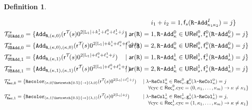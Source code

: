\documentclass[10pt,a4paper]{amsart}
\theoremstyle{definition}
\numberwithin{equation}{section}
\theoremstyle{plain}
\theoremstyle{definition}
\newtheorem{definition}[definition]{Definition}
\theoremstyle{myexample}
\theoremstyle{plain}
\theoremstyle{definition}
\newcommand{\cols}{\mathbb{L}}
\newcommand{\arity}[1]{\fcn{ar}(#1)}
\newcommand{\radd}[4]{#4\pred{\texttt{-}Add}^{#3}_{#1#2}}
\newcommand{\unradd}[2]{#2\pred{\texttt{-}Add}_{#1}}
\newcommand{\recol}[2]{#2\pred{\texttt{-}ReCol}_{#1}}
\newcommand{\fcn}[1]{\mathsf{#1}}
\newcommand{\pred}[1]{\mathtt{#1}}
\newcommand{\rpred}{\pred{R}}
\newcommand{\shortto}{\hstretch{0.5}{\to}}
\begin{document}
\begin{definition}
\begin{itemize}
\begin{align*}
			&&& \hspace{3ex} i_1+i_2 = 1,\fcn{f}_s(\radd{\kappa_1}{\kappa_2}{I}{\rpred}) = j   \} \\
			\mathcal{T}_{\pred{UUAdd},0}^{s} &=  \{ \pred{Add}_{\rpred, (\kappa, 0)}(\fcn{r}^{\mathcal{T}}\!(s)0^{2|\cols_1| +k_s^1+\ell_s^0+\ell_s^1+j}) &&\hspace{-7ex}\mid \arity{\rpred} = 1,  \unradd{\kappa}{\rpred}^0\in\fcn{URel}_{s}^0,\fcn{f}_s^{0}(\unradd{\kappa}{\rpred}^{0}) = j   \} \\
\mathcal{T}_{\pred{UBAdd},0}^{s} &=  \{ \pred{Add}_{\rpred, (\kappa, 0), (\kappa, 0)}(\fcn{r}^{\mathcal{T}}\!(s)0^{2|\cols_1| +k_s^1+\ell_s^0+\ell_s^1+j}) \!\!\! &&\hspace{-7ex}\mid \arity{\rpred} = 2,  \unradd{\kappa}{\rpred}^0\in\fcn{URel}_{s}^0,\fcn{f}_s^{0}(\unradd{\kappa}{\rpred}^{0}) = j   \} \\
\mathcal{T}_{\pred{UUAdd},1}^{s} &=  \{ \pred{Add}_{\rpred, (\kappa, 1)}(\fcn{r}^{\mathcal{T}}\!(s)0^{2|\cols_1| +\ell_s^0+\ell_s^1+j}) &&\hspace{-7ex}\mid \arity{\rpred} = 1,  \unradd{\kappa}{\rpred}^1\in\fcn{URel}_{s}^1,\fcn{f}_s^{1}(\unradd{\kappa}{\rpred}^{1}) = j   \} \\
\mathcal{T}_{\pred{UBAdd},1}^{s} &=  \{ \pred{Add}_{\rpred, (\kappa, 1), (\kappa, 1)}(\fcn{r}^{\mathcal{T}}\!(s)0^{2|\cols_1| +\ell_s^0+\ell_s^1+j}) &&\hspace{-7ex}\mid \arity{\rpred} = 2,  \unradd{\kappa}{\rpred}^1\in\fcn{URel}_{s}^1,\fcn{f}_s^{1}(\unradd{\kappa}{\rpred}^{1}) = j   \} \\
		\end{align*}
\pagebreak
		\begin{align*}
			\mathcal{T}_{\pred{Rec}, 0}^{s} &=  \{ \pred{Recolor}_{(\kappa, 0)\shortto(\lambda, 0)}(\fcn{r}^{\mathcal{T}}\!(s)0^{2|\cols_1| + \ell_s^1+ j}) &&\mid \recol{\kappa}{\lambda}^{0}\in\fcn{Rec}_s^{0}, \fcn{g}_s^{0}(\recol{\kappa}{\lambda}^{0}) = j   \\[-1ex] &&& \hspace{3ex}\forall\mathrm{cyc}\in\fcn{Rec}_s^{0}. \mathrm{cyc} = (0, \kappa_1, \ldots, \kappa_m) \rightarrow \kappa \neq \kappa_1 \} \\
			\mathcal{T}_{\pred{Rec}, 1}^{s} &=  \{ \pred{Recolor}_{(\kappa, 1)\shortto(\lambda, 1)}(\fcn{r}^{\mathcal{T}}\!(s)0^{2|\cols_1|  + j}) &&\mid \recol{\kappa}{\lambda}^{1}\in\fcn{Rec}_s^{1},\fcn{g}_s^1(\recol{\kappa}{\lambda}^{1}) = j , \\[-1ex] &&& \hspace{3ex}\forall\mathrm{cyc}\in\fcn{Rec}_s^{1}. \mathrm{cyc} = (1, \kappa_1, \ldots, \kappa_m) \rightarrow \kappa \neq \kappa_1 \} \\

\end{align*}
\end{itemize}
\end{definition}
\end{document}
